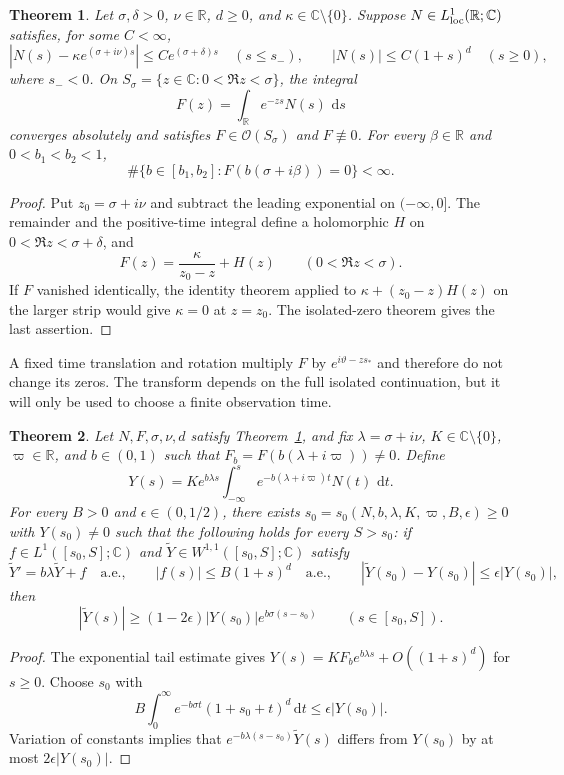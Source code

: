 \documentclass[11pt]{amsart}
\newtheorem{theorem}{Theorem}[section]
\theoremstyle{remark}
\numberwithin{equation}{section}
\newcommand{\R}{\mathbb R}
\newcommand{\C}{\mathbb C}
\newcommand{\dd}{\,\mathrm d}
\begin{document}
\begin{theorem}
\label{nt:thm:laplace}
Let $\sigma,\delta>0$, $\nu\in\R$, $d\ge0$, and
$\kappa\in\C\setminus\{0\}$. Suppose
$N\in L^1_{\rm loc}(\R;\C)$ satisfies, for some $C<\infty$,
\[
 |N(s)-\kappa e^{(\sigma+i\nu)s}|\le Ce^{(\sigma+\delta)s}
       \quad(s\le s_-),\qquad
 |N(s)|\le C(1+s)^d\quad(s\ge0),
\]
where $s_-<0$. On $S_\sigma=\{z\in\C:0<\Re z<\sigma\}$,
the integral
\[
 F(z)=\int_\R e^{-zs}N(s)\,\dd s
\]
converges absolutely and satisfies $F\in\mathcal O(S_\sigma)$ and
$F\not\equiv0$. For every $\beta\in\R$ and
$0<b_1<b_2<1$,
\[
 \#\{b\in[b_1,b_2]:F(b(\sigma+i\beta))=0\}<\infty.
\]
\end{theorem}
\begin{proof}
Put $z_0=\sigma+i\nu$ and subtract the leading exponential on
$(-\infty,0]$. The remainder and the positive-time integral define
a holomorphic $H$ on $0<\Re z<\sigma+\delta$, and
\[
 F(z)=\frac{\kappa}{z_0-z}+H(z)\qquad(0<\Re z<\sigma).
\]
If $F$ vanished identically, the identity theorem applied to
$\kappa+(z_0-z)H(z)$ on the larger strip would give $\kappa=0$
at $z=z_0$. The isolated-zero theorem gives the last assertion.
\end{proof}

A fixed time translation and rotation multiply $F$ by
$e^{i\vartheta-zs_*}$ and therefore do not change its zeros.
The transform depends on the full isolated continuation, but it
will only be used to choose a finite observation time.

\begin{theorem}
\label{nt:thm:survival}
Let $N,F,\sigma,\nu,d$ satisfy Theorem~\ref{nt:thm:laplace}, and
fix $\lambda=\sigma+i\nu$, $K\in\C\setminus\{0\}$,
$\varpi\in\R$, and $b\in(0,1)$ such that
$F_b=F(b(\lambda+i\varpi))\ne0$. Define
\begin{equation}\label{nt:eq:Y}
 Y(s)=K e^{b\lambda s}\int_{-\infty}^s
                  e^{-b(\lambda+i\varpi)t}N(t)\,\dd t.
\end{equation}
For every $B>0$ and $\epsilon\in(0,1/2)$, there exists
$s_0=s_0(N,b,\lambda,K,\varpi,B,\epsilon)\ge0$ with $Y(s_0)\ne0$
such that the following holds for every $S>s_0$:
if $f\in L^1([s_0,S];\C)$ and
$\widetilde Y\in W^{1,1}([s_0,S];\C)$ satisfy
\[
 \widetilde Y'=b\lambda\widetilde Y+f\quad\text{a.e.},\qquad
 |f(s)|\le B(1+s)^d\quad\text{a.e.},\qquad
 |\widetilde Y(s_0)-Y(s_0)|\le\epsilon|Y(s_0)|,
\]
then
\begin{equation}\label{nt:eq:lowerbound}
 |\widetilde Y(s)|\ge
 (1-2\epsilon)|Y(s_0)|e^{b\sigma(s-s_0)}
 \qquad(s\in[s_0,S]).
\end{equation}
\end{theorem}
\begin{proof}
The exponential tail estimate gives
$Y(s)=KF_be^{b\lambda s}+O((1+s)^d)$ for $s\ge0$.
Choose $s_0$ with
\[
 B\int_0^\infty e^{-b\sigma t}(1+s_0+t)^d\dd t
                       \le\epsilon|Y(s_0)|.
\]
Variation of constants implies that
$e^{-b\lambda(s-s_0)}\widetilde Y(s)$ differs from $Y(s_0)$
by at most $2\epsilon|Y(s_0)|$.
\end{proof}
\end{document}
